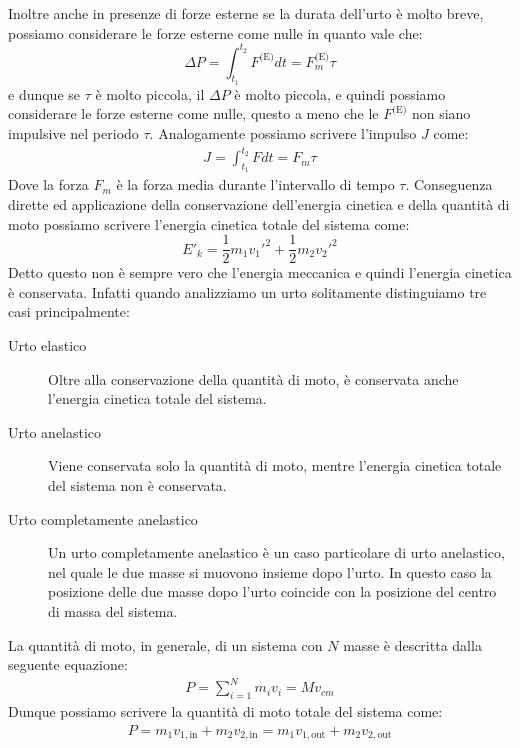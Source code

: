    Inoltre anche in presenze di forze esterne se la durata dell'urto è molto breve, possiamo considerare le forze esterne come nulle in quanto vale che:
    $$
        \Delta P=\int_{t_1}^{t_2} F^{\text{(E)}} dt = F^{\text{(E)}}_{m}\tau
    $$
    e dunque se $\tau$ è molto piccola, il $\Delta P$ è molto piccola, e quindi possiamo considerare le forze esterne come nulle, questo a meno che le $F^{\text{(E)}}$ non siano impulsive nel periodo $\tau$.\newline
    Analogamente possiamo scrivere l'impulso $J$ come:
    \begin{align}
        J = \int_{t_1}^{t_2} F dt = F_{m}\tau
    \end{align}
    Dove la forza $F_{m}$ è la forza media durante l'intervallo di tempo $\tau$.\newline
    Conseguenza dirette ed applicazione della conservazione dell'energia cinetica e della quantità di moto possiamo scrivere l'energia cinetica totale del sistema come:
    $$
        E'_k = \frac12m_1v_1'^2 + \frac12m_2v_2'^2
    $$
    Detto questo non è sempre vero che l'energia meccanica e quindi l'energia cinetica è conservata. Infatti quando analizziamo un urto solitamente distinguiamo tre casi principalmente: \begin{description}
        \item[Urto elastico] Oltre alla conservazione della quantità di moto, è conservata anche l'energia cinetica totale del sistema.
        \item[Urto anelastico] Viene conservata solo la quantità di moto, mentre l'energia cinetica totale del sistema non è conservata.
        \item[Urto completamente anelastico] Un urto completamente anelastico è un caso particolare di urto anelastico, nel quale le due masse si muovono insieme dopo l'urto. In questo caso la posizione delle due masse dopo l'urto coincide con la posizione del centro di massa del sistema.
    \end{description}
    La quantità di moto, in generale, di un sistema con $N$ masse è descritta dalla seguente equazione:
    \begin{align}
        P = \sum_{i=1}^{N} m_i v_i = M v_{cm} \label{eq:quantitaMoto}
    \end{align}
    Dunque possiamo scrivere la quantità di moto totale del sistema come:
    \begin{align*}
        P = m_1v_{1,\text{in}} + m_2v_{2,\text{in}} = m_1v_{1,\text{out}} + m_2v_{2,\text{out}}
    \end{align*}
